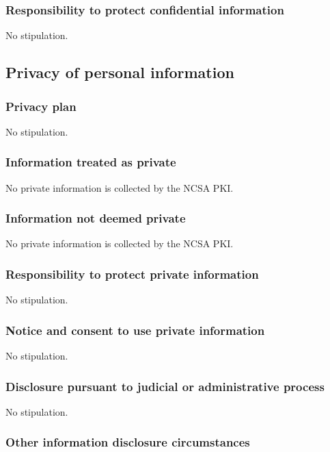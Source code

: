 \documentclass[10pt]{article}
\begin{document}
\subsubsection{Responsibility to protect confidential information}

No stipulation.

\subsection{Privacy of personal information}

\subsubsection{Privacy plan}

No stipulation.

\subsubsection{Information treated as private}

No private information is collected by the NCSA PKI.

\subsubsection{Information not deemed private}

No private information is collected by the NCSA PKI.

\subsubsection{Responsibility to protect private information}

No stipulation.

\subsubsection{Notice and consent to use private information}

No stipulation.

\subsubsection{Disclosure pursuant to judicial or administrative
  process}

No stipulation.

\subsubsection{Other information disclosure circumstances}
\end{document}
